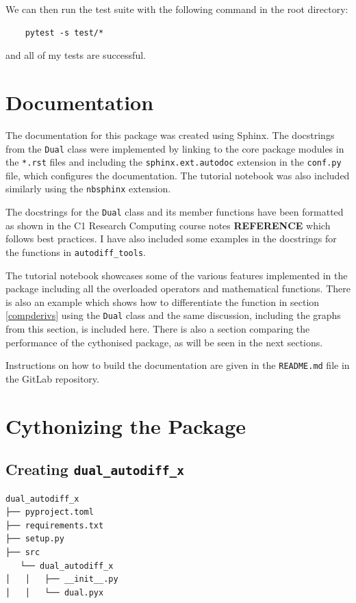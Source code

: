 \documentclass{article}
\begin{document}
We can then run the test suite with the following command in the root directory:
\begin{lstlisting}
    pytest -s test/*
\end{lstlisting}
and all of my tests are successful. 

\section{Documentation} \label{docs}
The documentation for this package was created using Sphinx. The docstrings from the \texttt{Dual} class were implemented by linking to the core package modules in the \texttt{*.rst} files and including the \texttt{sphinx.ext.autodoc} extension in the \texttt{conf.py} file, which configures the documentation. The tutorial notebook was also included similarly using the \texttt{nbsphinx} extension. 

The docstrings for the \texttt{Dual} class and its member functions have been formatted as shown in the C1 Research Computing course notes \textbf{REFERENCE} which follows best practices. I have also included some examples in the docstrings for the functions in \texttt{autodiff\_tools}. 

The tutorial notebook showcases some of the various features implemented in the package including all the overloaded operators and mathematical functions. There is also an example which shows how to differentiate the function in section \ref{compderivs} using the \texttt{Dual} class and the same discussion, including the graphs from this section, is included here. There is also a section comparing the performance of the cythonised package, as will be seen in 
the next sections.

Instructions on how to build the documentation are given in the \texttt{README.md} file in the GitLab repository. 

\section{Cythonizing the Package}

\subsection{Creating \texttt{dual\_autodiff\_x}}
\begin{lstlisting}
dual_autodiff_x
├── pyproject.toml
├── requirements.txt
├── setup.py
├── src
   └── dual_autodiff_x
│   │   ├── __init__.py
│   │   └── dual.pyx

\end{lstlisting}
\end{document}

